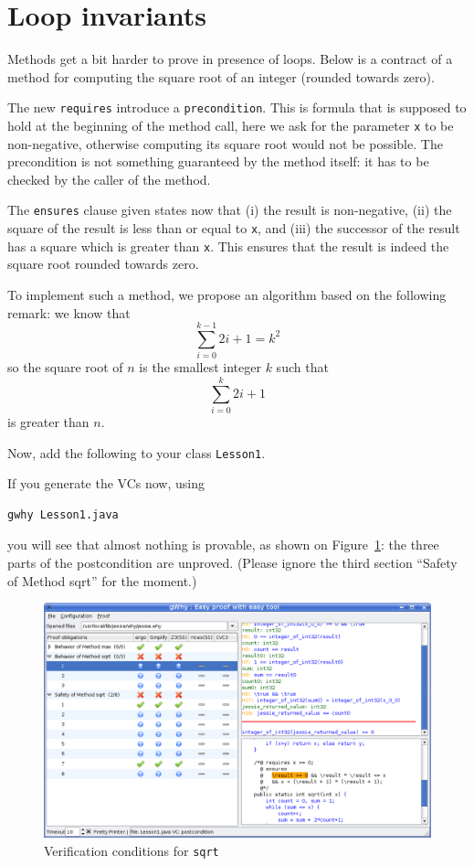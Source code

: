 \documentclass[a4paper,11pt,twoside,openright]{report}
\begin{document}
\section{Loop invariants}

Methods get a bit harder to prove in presence of loops. Below is a
contract of a method for computing the square root of an 
integer (rounded towards zero).

The new \texttt{requires} introduce a \texttt{precondition}. This is
formula that is supposed to hold at the beginning of the method call,
here we ask for the parameter \texttt{x} to be non-negative, otherwise
computing its square root would not be possible. The precondition is
not something guaranteed by the method itself: it has to be checked by
the caller of the method.

The \texttt{ensures} clause given states now that (i) the result is
non-negative, (ii) the square of the result is less than or equal to
\texttt{x}, and (iii) the successor of the result has a square which
is greater than \texttt{x}. This ensures that the result is indeed the
square root rounded towards zero.

To implement such a method, we propose an algorithm based on the
following remark: we know that
\[
\sum_{i=0}^{k-1} 2i+1 = k^2
\]
so the square root of $n$ is the smallest integer $k$ such that
\[
\sum_{i=0}^{k} 2i+1  
\]
is greater than $n$.

Now, add the following to your class \texttt{Lesson1}.

If you generate the VCs now, using
\begin{verbatim}
gwhy Lesson1.java
\end{verbatim}
you will see that almost nothing is provable, as shown on
Figure~\ref{fig:sqrt}: the three parts of the postcondition are
unproved. (Please ignore the third section ``Safety of Method sqrt''
for the moment.)

\begin{figure}[t]
  \begin{center}
    \includegraphics[width=\textwidth]{Lesson1_sqrt.png}
  \end{center}
  \caption{Verification conditions for \texttt{sqrt}}
\label{fig:sqrt}
\hrulefill
\end{figure}
\end{document}
